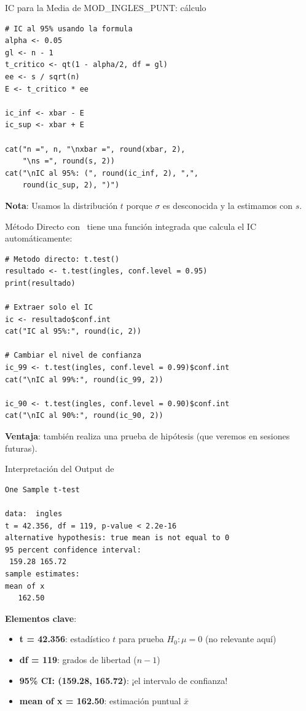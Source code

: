 \documentclass[aspectratio=169, 11pt]{beamer}
\begin{document}
\begin{frame}[fragile]{IC para la Media de MOD\_INGLES\_PUNT: cálculo}
\begin{lstlisting}
# IC al 95% usando la formula
alpha <- 0.05
gl <- n - 1
t_critico <- qt(1 - alpha/2, df = gl)
ee <- s / sqrt(n)
E <- t_critico * ee

ic_inf <- xbar - E
ic_sup <- xbar + E

cat("n =", n, "\nxbar =", round(xbar, 2),
    "\ns =", round(s, 2))
cat("\nIC al 95%: (", round(ic_inf, 2), ",",
    round(ic_sup, 2), ")")
\end{lstlisting}

\vspace{0.2cm}
\textbf{Nota}: Usamos la distribución $t$ porque $\sigma$ es desconocida y la estimamos con $s$.
\end{frame}

\begin{frame}[fragile]{Método Directo con }
\R\ tiene una función integrada que calcula el IC automáticamente:

\begin{lstlisting}
# Metodo directo: t.test()
resultado <- t.test(ingles, conf.level = 0.95)
print(resultado)

# Extraer solo el IC
ic <- resultado$conf.int
cat("IC al 95%:", round(ic, 2))

# Cambiar el nivel de confianza
ic_99 <- t.test(ingles, conf.level = 0.99)$conf.int
cat("\nIC al 99%:", round(ic_99, 2))

ic_90 <- t.test(ingles, conf.level = 0.90)$conf.int
cat("\nIC al 90%:", round(ic_90, 2))
\end{lstlisting}

\vspace{0.2cm}
\small\textbf{Ventaja}:  también realiza una prueba de hipótesis (que veremos en sesiones futuras).
\end{frame}

\begin{frame}[fragile]{Interpretación del Output de }
\begin{lstlisting}[basicstyle=\ttfamily\footnotesize]
	One Sample t-test

data:  ingles
t = 42.356, df = 119, p-value < 2.2e-16
alternative hypothesis: true mean is not equal to 0
95 percent confidence interval:
 159.28 165.72
sample estimates:
mean of x
   162.50
\end{lstlisting}

\vspace{0.3cm}
\textbf{Elementos clave}:
\begin{itemize}
  \item \textbf{t = 42.356}: estadístico $t$ para prueba $H_0: \mu = 0$ (no relevante aquí)
  \item \textbf{df = 119}: grados de libertad ($n-1$)
  \item \textbf{95\% CI: (159.28, 165.72)}: ¡el intervalo de confianza!
  \item \textbf{mean of x = 162.50}: estimación puntual $\bar{x}$
\end{itemize}
\end{frame}
\end{document}
